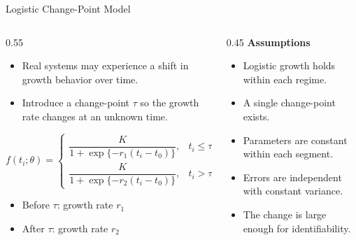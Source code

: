 \documentclass[
  ignorenonframetext,
  aspectratio=169,
]{beamer}
\providecommand{\tightlist}{%
  \setlength{\itemsep}{0pt}\setlength{\parskip}{0pt}}\usepackage{longtable,booktabs,array}
\begin{document}
\begin{frame}{Logistic Change-Point Model}
\label{logistic-change-point-model}
\begin{columns}[T]
\begin{column}{0.55\textwidth}
\begin{itemize}
\tightlist
\item
  Real systems may experience a shift in growth behavior over time.
\item
  Introduce a change-point \(\tau\) so the growth rate changes at an
  unknown time.
\end{itemize}

\[
f(t_i;\theta)=
\begin{cases}
\dfrac{K}{1+\exp\{-r_1(t_i-t_0)\}}, & t_i \le \tau, \\
\dfrac{K}{1+\exp\{-r_2(t_i-t_0)\}}, & t_i > \tau.
\end{cases}
\]

\begin{itemize}
\tightlist
\item
  Before \(\tau\): growth rate \(r_1\)
\item
  After \(\tau\): growth rate \(r_2\)
\end{itemize}
\end{column}

\begin{column}{0.45\textwidth}
\textbf{Assumptions}

\begin{itemize}
\tightlist
\item
  Logistic growth holds within each regime.
\item
  A single change-point exists.
\item
  Parameters are constant within each segment.
\item
  Errors are independent with constant variance.
\item
  The change is large enough for identifiability.
\end{itemize}
\end{column}
\end{columns}
\end{frame}
\end{document}
